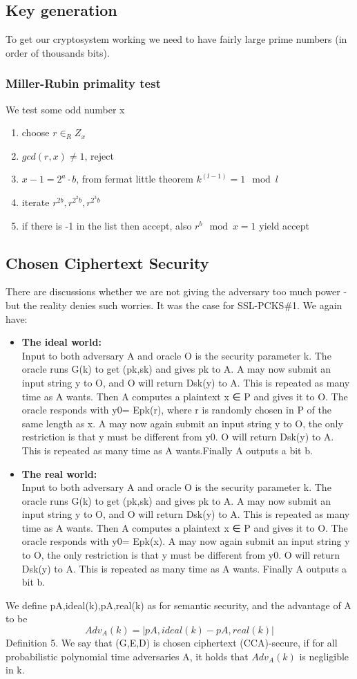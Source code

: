 \documentclass[a4paper,10pt]{article}
\begin{document}
\subsection*{Key generation}
To get our cryptosystem working we need to have fairly large prime numbers (in order of thousands bits). 
\subsubsection*{Miller-Rubin primality test}
We test some odd number x
\begin{enumerate}
\item choose $r \in_R Z_x$
\item $gcd(r,x) \neq 1$, reject
\item $x-1 = 2^a\cdot b$, from fermat little theorem $k^(l-1) = 1 \mod l$
\item iterate $r^{2b},r^{2^2b},r^{2^3b}$
\item if there is -1 in the list then accept, also $r^b \mod x = 1$ yield accept
\end{enumerate}

\subsection*{Chosen Ciphertext Security}
There are discussions whether we are not giving the adversary too much power - but the reality denies such worries. It was the case for SSL-PCKS\#1. We again have:
\begin{itemize}
\item
\textbf{The ideal world:}\\ Input to both adversary A and oracle O is the security parameter k. The oracle
runs G(k) to get (pk,sk) and gives pk to A. A may now submit an input string y to O, and
O will return Dsk(y) to A. This is repeated as many time as A wants. Then A computes a
plaintext x ∈ P and gives it to O. The oracle responds with y0= Epk(r), where r is randomly
chosen in P of the same length as x. A may now again submit an input string y to O, the only
restriction is that y must be different from y0. O will return Dsk(y) to A. This is repeated as
many time as A wants.Finally A outputs a bit b.
\item
\textbf{The real world:}\\ Input to both adversary A and oracle O is the security parameter k. The oracle
runs G(k) to get (pk,sk) and gives pk to A. A may now submit an input string y to O, and
O will return Dsk(y) to A. This is repeated as many time as A wants. Then A computes a
plaintext x ∈ P and gives it to O. The oracle responds with y0= Epk(x). A may now again
submit an input string y to O, the only restriction is that y must be different from y0. O will
return Dsk(y) to A. This is repeated as many time as A wants.
Finally A outputs a bit b.
\end{itemize}
We define pA,ideal(k),pA,real(k) as for semantic security, and the advantage of A to be
$$Adv_A(k) = |pA,ideal(k) − pA,real(k)|$$
Definition 5. We say that (G,E,D) is chosen ciphertext (CCA)-secure, if for all probabilistic polynomial time adversaries A, it holds that $Adv_A(k)$ is negligible in k.
\end{document}
